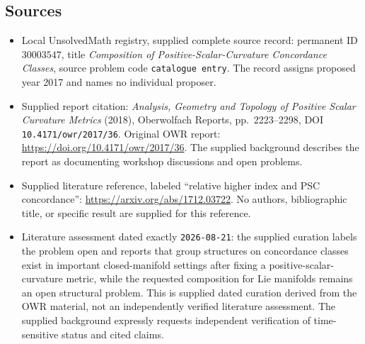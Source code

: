 \documentclass[11pt]{article}
\begin{document}
\subsection{Sources}
\begin{itemize}
\item Local UnsolvedMath registry, supplied complete source record: permanent ID \(30003547\), title \emph{Composition of Positive-Scalar-Curvature Concordance Classes}, source problem code \texttt{catalogue entry}. The record assigns proposed year 2017 and names no individual proposer.
\item Supplied report citation: \emph{Analysis, Geometry and Topology of Positive Scalar Curvature Metrics} (2018), Oberwolfach Reports, pp.~2223--2298, DOI \texttt{10.4171/owr/2017/36}. Original OWR report: \url{https://doi.org/10.4171/owr/2017/36}. The supplied background describes the report as documenting workshop discussions and open problems.
\item Supplied literature reference, labeled ``relative higher index and PSC concordance'': \url{https://arxiv.org/abs/1712.03722}. No authors, bibliographic title, or specific result are supplied for this reference.
\item Literature assessment dated exactly \texttt{2026-08-21}: the supplied curation labels the problem open and reports that group structures on concordance classes exist in important closed-manifold settings after fixing a positive-scalar-curvature metric, while the requested composition for Lie manifolds remains an open structural problem. This is supplied dated curation derived from the OWR material, not an independently verified literature assessment. The supplied background expressly requests independent verification of time-sensitive status and cited claims.
\end{itemize}
\end{document}
